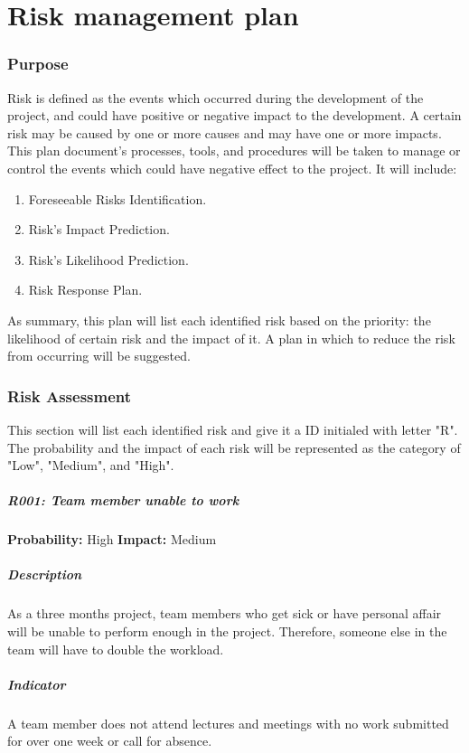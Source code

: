 \documentclass[11pt, a4paper]{report}
\begin{document}
\chapter{Risk management plan}
\subsection{Purpose}
Risk is defined as the events which occurred during the development of the project, and could have positive or negative impact to the development. A certain risk may be caused by one or more causes and may have one or more impacts. This plan document's processes, tools, and procedures will be taken to manage or control the events which could have negative effect to the project. It will include:
\begin{enumerate}
	\item Foreseeable Risks Identification.
	\item Risk's Impact Prediction.
	\item Risk's Likelihood Prediction.
	\item Risk Response Plan.
\end{enumerate}
As summary, this plan will list each identified risk based on the priority: the likelihood of certain risk and the impact of it. A plan in which to reduce the risk from occurring will be suggested.

\subsection{Risk Assessment}
This section will list each identified risk and give it a ID initialed with letter "R". The probability and the impact of each risk will be represented as the category of "Low", "Medium", and "High". \\
	\paragraph{R001: Team member unable to work} \hspace{1cm} \textbf{Probability: }High\hspace{1cm}   \textbf{Impact: }Medium
	\paragraph{Description}As a three months project, team members who get sick or have personal affair will be unable to perform enough in the project. Therefore, someone else in the team will have to double the workload.
	\paragraph{Indicator}A team member does not attend lectures and meetings with no work submitted for over one week or call for absence.
\end{document}
